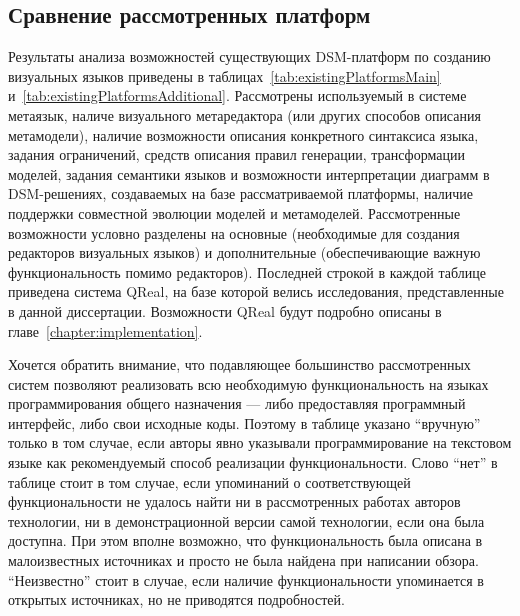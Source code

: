 \subsection{Сравнение рассмотренных платформ}
Результаты анализа возможностей существующих DSM-платформ по созданию визуальных 
языков приведены в таблицах~\ref{tab:existingPlatformsMain} и~\ref{tab:existingPlatformsAdditional}.
Рассмотрены используемый в системе метаязык, наличе визуального метаредактора (или других способов описания метамодели),
наличие возможности описания конкретного синтаксиса языка, задания ограничений, средств описания
правил генерации, трансформации моделей, задания семантики языков и возможности интерпретации
диаграмм в DSM-решениях, создаваемых на базе рассматриваемой платформы, наличие поддержки совместной
эволюции моделей и метамоделей. Рассмотренные возможности условно разделены на основные 
(необходимые для создания редакторов визуальных языков) и дополнительные (обеспечивающие
важную функциональность помимо редакторов). Последней строкой в каждой таблице приведена 
система QReal, на базе которой велись исследования, представленные в данной диссертации.
Возможности QReal будут подробно описаны в главе~\ref{chapter:implementation}.

Хочется обратить внимание, что подавляющее большинство рассмотренных систем позволяют реализовать
всю необходимую функциональность на языках программирования общего назначения --- либо 
предоставляя программный интерфейс, либо свои исходные коды. Поэтому в таблице указано
"`вручную"' только в том случае, если авторы явно указывали программирование на текстовом языке
как рекомендуемый способ реализации функциональности. Слово "`нет"' в таблице стоит в том
случае, если упоминаний о соответствующей функциональности не удалось найти ни в рассмотренных 
работах авторов технологии, ни в демонстрационной версии самой технологии, если она была доступна.
При этом вполне возможно, что функциональность была описана в малоизвестных источниках и просто
не была найдена при написании обзора. "`Неизвестно"' стоит в случае, если наличие функциональности
упоминается в открытых источниках, но не приводятся подробностей.


